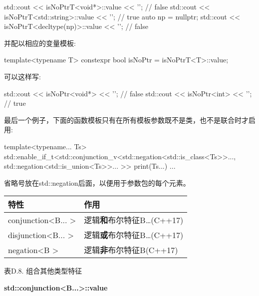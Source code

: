 \begin{cpp}
std::cout << isNoPtrT<void*>::value << ’\n’; // false
std::cout << isNoPtrT<std::string>::value << ’\n’; // true
auto np = nullptr;
std::cout << isNoPtrT<decltype(np)>::value << ’\n’; // false
\end{cpp}

并配以相应的变量模板:

\begin{cpp}
template<typename T>
constexpr bool isNoPtr = isNoPtrT<T>::value;
\end{cpp}

可以这样写:

\begin{cpp}
std::cout << isNoPtr<void*> << ’\n’; // false
std::cout << isNoPtr<int> << ’\n’; // true
\end{cpp}

最后一个例子，下面的函数模板只有在所有模板参数既不是类，也不是联合时才启用:

\begin{cpp}
template<typename... Ts>
std::enable_if_t<std::conjunction_v<std::negation<std::is_class<Ts>>...,
									std::negation<std::is_union<Ts>>...
									>>
print(Ts...)
{
	...
}
\end{cpp}

省略号放在std::negation后面，以便用于参数包的每个元素。

\begin{table}[H]
	\begin{center}
	\begin{tabular}{l|l}
		\hline
		\textbf{特性}                            & \textbf{作用}                                   \\ \hline
		conjunction\textless{}B... \textgreater{} & 逻辑\textbf{和}布尔特征B…(C++17) \\ \hline
		disjunction\textless{}B... \textgreater{} & 逻辑\textbf{或}布尔特征B…(C++17)  \\ \hline
		negation\textless{}B \textgreater{}       & 逻辑\textbf{非}布尔特征B(C++17)     \\ \hline
	\end{tabular}
	\end{center}
\end{table}

\begin{center}
表D.8. 组合其他类型特征
\end{center}

\textbf{std::conjunction<B...>::value}


